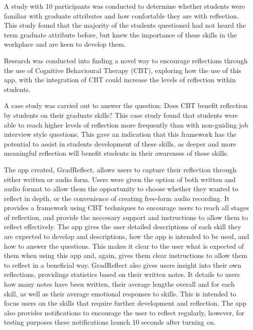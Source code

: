 \documentclass{l4proj}
\begin{document}
A study with 10 participants was conducted to determine whether students were familiar with graduate attributes and how confortable they are with reflection. This study found that the majority of the students questioned had not heard the term graduate attribute before, but knew the importance of these skills in the workplace and are keen to develop them.

Research was conducted into finding a novel way to encourage reflections through the use of Cognitive Behavioural Therapy (CBT), exploring how the use of this app, with the integration of CBT could increase the levels of reflection within students. 

A case study was carried out to answer the question: Does CBT benefit reflection by students on their graduate skills? This case study found that students were able to reach higher levels of reflection more frequently than with non-guiding job interview style questions. This gave an indication that this framework has the potential to assist in students development of these skills, as deeper and more meaningful reflection will benefit students in their awareness of these skills.

The app created, GradReflect, allows users to capture their reflection through either written or audio form. Users were given the option of both written and audio format to allow them the opportunity to choose whether they wanted to reflect in depth, or the convenience of creating free-form audio recording. It provides a framework using CBT techniques to encourage users to reach all stages of reflection, and provide the neccesary support and instructions to allow them to reflect effectively. The app gives the user detailed descriptions of each skill they are expected to develop and descriptions, how the app is intended to be used, and how to answer the questions. This makes it clear to the user what is expected of them when using this app and, again, gives them clear instructions to allow them to reflect in a beneficial way. GradReflect also gives users insight into their own reflections, providings statistics based on their written notes. It details to users how many notes have been written, their average lengths overall and for each skill, as well as their average emotional responses to skills. This is intended to focus users on the skills that require further development and reflection. The app also provides notifications to encourage the user to reflect regularly, however, for testing purposes these notifications launch 10 seconds after turning on.
\end{document}

